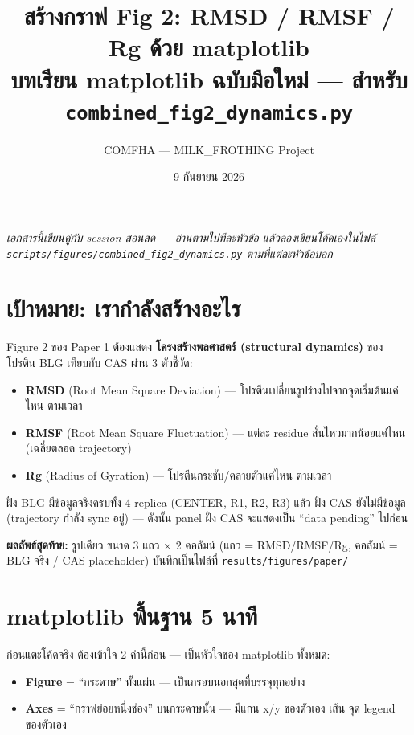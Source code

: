\documentclass[11pt,a4paper]{article}
\title{\textbf{สร้างกราฟ Fig 2: RMSD / RMSF / Rg ด้วย matplotlib}\\
\large บทเรียน matplotlib ฉบับมือใหม่ — สำหรับ \texttt{combined\_fig2\_dynamics.py}}
\author{COMFHA — MILK\_FROTHING Project}
\date{9 กันยายน 2026}
\begin{document}
\maketitle

\begin{center}
\textit{เอกสารนี้เขียนคู่กับ session สอนสด — อ่านตามไปทีละหัวข้อ แล้วลองเขียนโค้ดเองในไฟล์\\
\texttt{scripts/figures/combined\_fig2\_dynamics.py} ตามที่แต่ละหัวข้อบอก}
\end{center}

\tableofcontents
\vspace{1em}

\section{เป้าหมาย: เรากำลังสร้างอะไร}
Figure 2 ของ Paper 1 ต้องแสดง \textbf{โครงสร้างพลศาสตร์ (structural dynamics)} ของโปรตีน BLG
เทียบกับ ${}$CAS ผ่าน 3 ตัวชี้วัด:

\begin{itemize}
  \item \textbf{RMSD} (Root Mean Square Deviation) — โปรตีนเปลี่ยนรูปร่างไปจากจุดเริ่มต้นแค่ไหน ตามเวลา
  \item \textbf{RMSF} (Root Mean Square Fluctuation) — แต่ละ residue สั่นไหวมากน้อยแค่ไหน (เฉลี่ยตลอด trajectory)
  \item \textbf{Rg} (Radius of Gyration) — โปรตีนกระชับ/คลายตัวแค่ไหน ตามเวลา
\end{itemize}

ฝั่ง BLG มีข้อมูลจริงครบทั้ง 4 replica (CENTER, R1, R2, R3) แล้ว ฝั่ง CAS ยังไม่มีข้อมูล
(trajectory กำลัง sync อยู่) — ดังนั้น panel ฝั่ง CAS จะแสดงเป็น ``data pending'' ไปก่อน

\textbf{ผลลัพธ์สุดท้าย:} รูปเดียว ขนาด 3 แถว $\times$ 2 คอลัมน์ (แถว = RMSD/RMSF/Rg,
คอลัมน์ = BLG จริง / CAS placeholder) บันทึกเป็นไฟล์ที่ \texttt{results/figures/paper/}

\section{matplotlib พื้นฐาน 5 นาที}
ก่อนแตะโค้ดจริง ต้องเข้าใจ 2 คำนี้ก่อน — เป็นหัวใจของ matplotlib ทั้งหมด:

\begin{itemize}
  \item \textbf{Figure} = ``กระดาษ'' ทั้งแผ่น — เป็นกรอบนอกสุดที่บรรจุทุกอย่าง
  \item \textbf{Axes} = ``กราฟย่อยหนึ่งช่อง'' บนกระดาษนั้น — มีแกน x/y ของตัวเอง เส้น จุด legend ของตัวเอง
\end{itemize}
\end{document}
